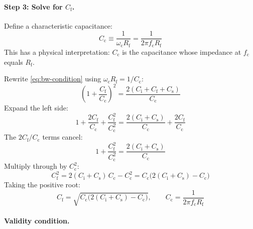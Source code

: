 \documentclass[a4paper,11pt]{article}
\begin{document}
\paragraph{Step 3: Solve for $C_{\mathrm{f}}$.}

Define a characteristic capacitance:
\begin{equation}
  C_{\mathrm{c}}
  \equiv \frac{1}{\omega_{\mathrm{c}} R_{\mathrm{f}}}
  = \frac{1}{2\pi f_{\mathrm{c}} R_{\mathrm{f}}}
  \label{eq:Cc}
\end{equation}
This has a physical interpretation: $C_{\mathrm{c}}$ is the capacitance
whose impedance at $f_{\mathrm{c}}$ equals $R_{\mathrm{f}}$.

Rewrite \eqref{eq:bw-condition} using
$\omega_{\mathrm{c}} R_{\mathrm{f}} = 1/C_{\mathrm{c}}$:
\begin{equation*}
  \left(1 + \frac{C_{\mathrm{f}}}{C_{\mathrm{c}}}\right)^{\!2}
  = \frac{2(C_{\mathrm{i}} + C_{\mathrm{f}} + C_{\mathrm{s}})}
         {C_{\mathrm{c}}}
\end{equation*}
Expand the left side:
\begin{equation*}
  1 + \frac{2C_{\mathrm{f}}}{C_{\mathrm{c}}}
    + \frac{C_{\mathrm{f}}^2}{C_{\mathrm{c}}^2}
  = \frac{2(C_{\mathrm{i}} + C_{\mathrm{s}})}{C_{\mathrm{c}}}
    + \frac{2C_{\mathrm{f}}}{C_{\mathrm{c}}}
\end{equation*}
The $2C_{\mathrm{f}}/C_{\mathrm{c}}$ terms cancel:
\begin{equation*}
  1 + \frac{C_{\mathrm{f}}^2}{C_{\mathrm{c}}^2}
  = \frac{2(C_{\mathrm{i}} + C_{\mathrm{s}})}{C_{\mathrm{c}}}
\end{equation*}
Multiply through by $C_{\mathrm{c}}^2$:
\begin{equation*}
  C_{\mathrm{f}}^2
  = 2(C_{\mathrm{i}} + C_{\mathrm{s}})\,C_{\mathrm{c}}
    - C_{\mathrm{c}}^2
  = C_{\mathrm{c}}\bigl(2(C_{\mathrm{i}} + C_{\mathrm{s}})
    - C_{\mathrm{c}}\bigr)
\end{equation*}
Taking the positive root:
\begin{equation}
  C_{\mathrm{f}}
  = \sqrt{C_{\mathrm{c}}\bigl(2(C_{\mathrm{i}} + C_{\mathrm{s}})
    - C_{\mathrm{c}}\bigr)},
  \qquad
  C_{\mathrm{c}} = \frac{1}{2\pi f_{\mathrm{c}} R_{\mathrm{f}}}
  \label{eq:Cf-exact}
\end{equation}

\paragraph{Validity condition.}
\end{document}

